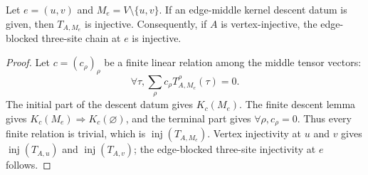\begin{theorem}%
    \label{thm:peps_edgeMiddleTensorInjective_of_kernelDescent}
    \leanok
    Let $e=(u,v)$ and $M_e=V\setminus\{u,v\}$. If an edge-middle kernel descent
    datum is given, then $T_{A,M_e}$ is injective. Consequently, if $A$ is
    vertex-injective, the edge-blocked three-site chain at $e$ is injective.
\end{theorem}
\begin{proof}\leanok
    Let $c=(c_{\rho})_{\rho}$ be a finite linear relation among the middle
    tensor vectors:
    \[
        \forall\tau,
        \sum_{\rho}c_{\rho}
        T_{A,M_e}^{\rho}(\tau)=0.
    \]
    The initial part of the descent datum gives $K_c(M_e)$. The finite descent
    lemma gives $K_c(M_e)\Longrightarrow K_c(\varnothing)$, and the terminal
    part gives $\forall\rho, c_{\rho}=0$. Thus every finite relation is
    trivial, which is $\operatorname{inj}(T_{A,M_e})$. Vertex injectivity at
    $u$ and $v$ gives $\operatorname{inj}(T_{A,u})$ and
    $\operatorname{inj}(T_{A,v})$; the edge-blocked three-site injectivity at
    $e$ follows.
\end{proof}

